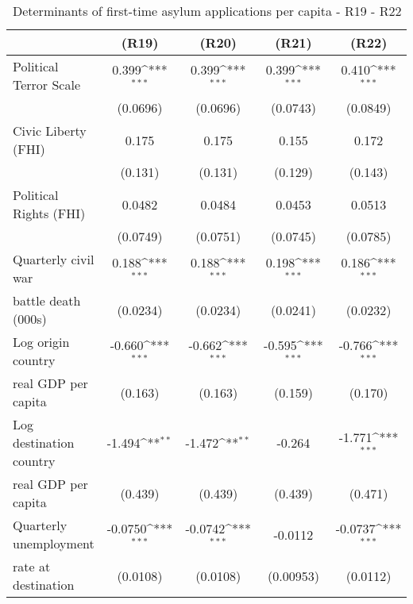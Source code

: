 \begin{table}[htbp]\centering \scriptsize
\def\sym#1{\ifmmode^{#1}\else\(^{#1}\)\fi}
\caption{Determinants of first-time asylum applications per capita - R19 - R22}
\begin{tabular}{l*{4}{c}}
\hline\hline
                    &\multicolumn{1}{c}{(R19)}         &\multicolumn{1}{c}{(R20)}         &\multicolumn{1}{c}{(R21)}         &\multicolumn{1}{c}{(R22)}         \\
\hline
Political Terror Scale&       0.399\sym{***}&       0.399\sym{***}&       0.399\sym{***}&       0.410\sym{***}\\
                    &    (0.0696)         &    (0.0696)         &    (0.0743)         &    (0.0849)         \\
[0,5em]
Civic Liberty (FHI) &       0.175         &       0.175         &       0.155         &       0.172         \\
                    &     (0.131)         &     (0.131)         &     (0.129)         &     (0.143)         \\
[0,5em]
Political Rights (FHI)&      0.0482         &      0.0484         &      0.0453         &      0.0513         \\
                    &    (0.0749)         &    (0.0751)         &    (0.0745)         &    (0.0785)         \\
[0,5em]
Quarterly civil war&       0.188\sym{***}&       0.188\sym{***}&       0.198\sym{***}&       0.186\sym{***}\\
 battle death (000s)                    &    (0.0234)         &    (0.0234)         &    (0.0241)         &    (0.0232)         \\
[0,5em]
Log origin country &      -0.660\sym{***}&      -0.662\sym{***}&      -0.595\sym{***}&      -0.766\sym{***}\\
real GDP per capita                    &     (0.163)         &     (0.163)         &     (0.159)         &     (0.170)         \\
[0,5em]
Log destination country&      -1.494\sym{**} &      -1.472\sym{**} &      -0.264         &      -1.771\sym{***}\\
 real GDP per capita                    &     (0.439)         &     (0.439)         &     (0.439)         &     (0.471)         \\
[0,5em]
Quarterly unemployment&     -0.0750\sym{***}&     -0.0742\sym{***}&     -0.0112         &     -0.0737\sym{***}\\
 rate at destination                    &    (0.0108)         &    (0.0108)         &   (0.00953)         &    (0.0112)         \\

\end{tabular}
\end{table}
